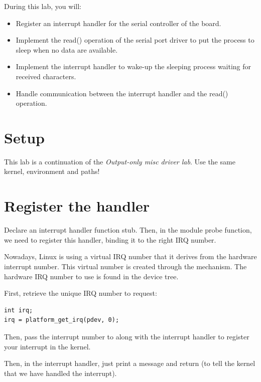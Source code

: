 
During this lab, you will:

\begin{itemize}
\item Register an interrupt handler for the serial controller of the
  board.
\item Implement the read() operation of the serial port driver to put
  the process to sleep when no data are available.
\item Implement the interrupt handler to wake-up the sleeping process
  waiting for received characters.
\item Handle communication between the interrupt handler and the
  read() operation.
\end{itemize}

\section{Setup}

This lab is a continuation of the {\em Output-only misc driver
lab}. Use the same kernel, environment and paths!

\section{Register the handler}

Declare an interrupt handler function stub. Then, in the module probe
function, we need to register this handler, binding it to the right
IRQ number.

Nowadays, Linux is using a virtual IRQ number that it derives from the
hardware interrupt number. This virtual number is created through the
 mechanism. The hardware IRQ number to use is found in
the device tree.

First, retrieve the unique IRQ number to request:

\begin{verbatim}
int irq;
irq = platform_get_irq(pdev, 0);
\end{verbatim}

Then, pass the interrupt number to  along
with the interrupt handler to register your interrupt in the kernel.

Then, in the interrupt handler, just print a message and return
 (to tell the kernel that we have handled the
interrupt).

